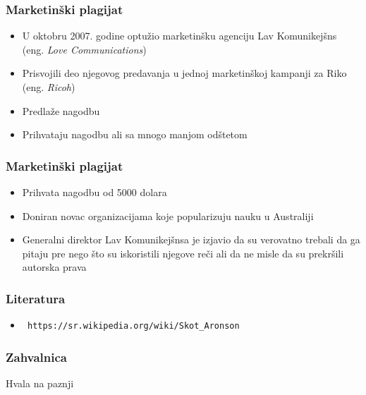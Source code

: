 \documentclass{beamer}
\begin{document}
\begin{frame}[fragile]\frametitle{Marketinški plagijat}
	\begin{itemize}
		\item<2-> U oktobru 2007. godine optužio marketinšku agenciju Lav Komunikejšns (eng. \textit{Love Communications})
		\item<2-> Prisvojili deo njegovog predavanja u jednoj marketinškoj kampanji za Riko (eng. \textit{Ricoh})
		\item<3-> Predlaže nagodbu
		\item<4-> Prihvataju nagodbu ali sa mnogo manjom odštetom
	\end{itemize}
\end{frame}

\begin{frame}[fragile]\frametitle{Marketinški plagijat}
	\begin{itemize}
		\item<1-> Prihvata nagodbu od 5000 dolara
		\item<2-> Doniran novac organizacijama koje popularizuju nauku u Australiji
		\item<3-> Generalni direktor Lav Komunikejšnsa je izjavio da su verovatno trebali da ga pitaju 
		pre nego što su iskoristili njegove reči ali da ne misle da su prekršili autorska prava
		
	\end{itemize}
\end{frame}

\begin{frame}[fragile]\frametitle{Literatura}
	\begin{itemize}
	\item \begin{verbatim} https://sr.wikipedia.org/wiki/Skot_Aronson \end{verbatim}
	\end{itemize}
\end{frame}

\begin{frame}[fragile]\frametitle{Zahvalnica}
	\begin{center}
		{\Huge Hvala na paznji}
	\end{center}	
\end{frame}

		
\end{document}
